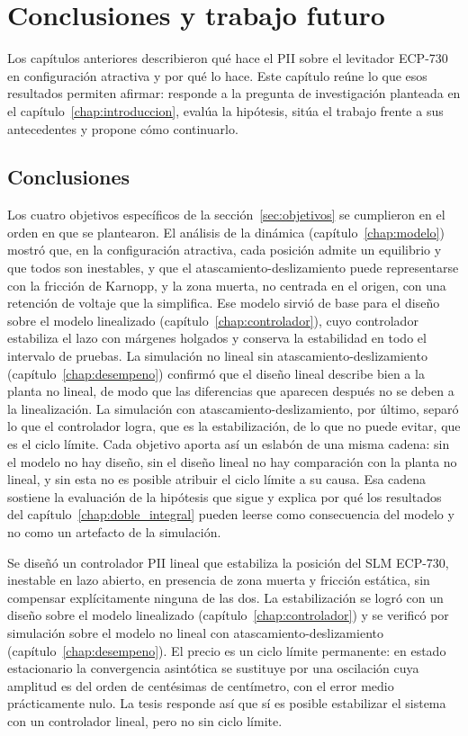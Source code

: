\chapter{Conclusiones y trabajo futuro}\label{chap:conclusiones}

Los capítulos anteriores describieron qué hace el PII sobre el levitador ECP-730 en configuración atractiva y por qué lo hace. Este capítulo reúne lo que esos resultados permiten afirmar: responde a la pregunta de investigación planteada en el capítulo~\ref{chap:introduccion}, evalúa la hipótesis, sitúa el trabajo frente a sus antecedentes y propone cómo continuarlo.

\section{Conclusiones}\label{sec:conclusiones}

Los cuatro objetivos específicos de la sección~\ref{sec:objetivos} se cumplieron en el orden en que se plantearon. El análisis de la dinámica (capítulo~\ref{chap:modelo}) mostró que, en la configuración atractiva, cada posición admite un equilibrio y que todos son inestables, y que el atascamiento-deslizamiento puede representarse con la fricción de Karnopp, y la zona muerta, no centrada en el origen, con una retención de voltaje que la simplifica. Ese modelo sirvió de base para el diseño sobre el modelo linealizado (capítulo~\ref{chap:controlador}), cuyo controlador estabiliza el lazo con márgenes holgados y conserva la estabilidad en todo el intervalo de pruebas. La simulación no lineal sin atascamiento-deslizamiento (capítulo~\ref{chap:desempeno}) confirmó que el diseño lineal describe bien a la planta no lineal, de modo que las diferencias que aparecen después no se deben a la linealización. La simulación con atascamiento-deslizamiento, por último, separó lo que el controlador logra, que es la estabilización, de lo que no puede evitar, que es el ciclo límite. Cada objetivo aporta así un eslabón de una misma cadena: sin el modelo no hay diseño, sin el diseño lineal no hay comparación con la planta no lineal, y sin esta no es posible atribuir el ciclo límite a su causa. Esa cadena sostiene la evaluación de la hipótesis que sigue y explica por qué los resultados del capítulo~\ref{chap:doble_integral} pueden leerse como consecuencia del modelo y no como un artefacto de la simulación.

Se diseñó un controlador PII lineal que estabiliza la posición del SLM ECP-730, inestable en lazo abierto, en presencia de zona muerta y fricción estática, sin compensar explícitamente ninguna de las dos. La estabilización se logró con un diseño sobre el modelo linealizado (capítulo~\ref{chap:controlador}) y se verificó por simulación sobre el modelo no lineal con atascamiento-deslizamiento (capítulo~\ref{chap:desempeno}). El precio es un ciclo límite permanente: en estado estacionario la convergencia asintótica se sustituye por una oscilación cuya amplitud es del orden de centésimas de centímetro, con el error medio prácticamente nulo. La tesis responde así que sí es posible estabilizar el sistema con un controlador lineal, pero no sin ciclo límite.

